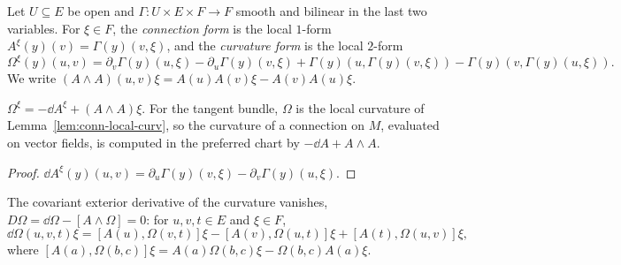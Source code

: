 \begin{definition}
  \label{def:connection-forms}
  \leanok
  Let $U \subseteq E$ be open and $\Gamma \colon U \times E \times F \to F$ smooth and bilinear in
  the last two variables. For $\xi \in F$, the \emph{connection form} is the local $1$-form
  $A^\xi(y)(v) = \Gamma(y)(v, \xi)$, and the \emph{curvature form} is the local $2$-form
  \[
    \Omega^\xi(y)(u, v) = \partial_v\Gamma(y)(u, \xi) - \partial_u\Gamma(y)(v, \xi)
      + \Gamma(y)(u, \Gamma(y)(v, \xi)) - \Gamma(y)(v, \Gamma(y)(u, \xi)).
  \]
  We write $(A \wedge A)(u, v)\xi = A(u)A(v)\xi - A(v)A(u)\xi$.
\end{definition}

\begin{theorem}
  \label{thm:structure-equation}
  \leanok
  $\Omega^\xi = -\dd A^\xi + (A \wedge A)\xi$. For the tangent bundle, $\Omega$ is the local
  curvature of Lemma~\ref{lem:conn-local-curv}, so the curvature of a connection on $M$, evaluated
  on vector fields, is computed in the preferred chart by $-\dd A + A \wedge A$.
\end{theorem}

\begin{proof}
  \leanok
  $\dd A^\xi(y)(u, v) = \partial_u\Gamma(y)(v, \xi) - \partial_v\Gamma(y)(u, \xi)$.
\end{proof}

\begin{theorem}
  \label{thm:second-bianchi}
  \leanok
  The covariant exterior derivative of the curvature vanishes, $D\Omega = \dd\Omega - [A \wedge
  \Omega] = 0$: for $u, v, t \in E$ and $\xi \in F$,
  \[
    \dd\Omega(u, v, t)\xi = [A(u), \Omega(v, t)]\xi - [A(v), \Omega(u, t)]\xi
      + [A(t), \Omega(u, v)]\xi,
  \]
  where $[A(a), \Omega(b, c)]\xi = A(a)\Omega(b, c)\xi - \Omega(b, c)A(a)\xi$.
\end{theorem}

